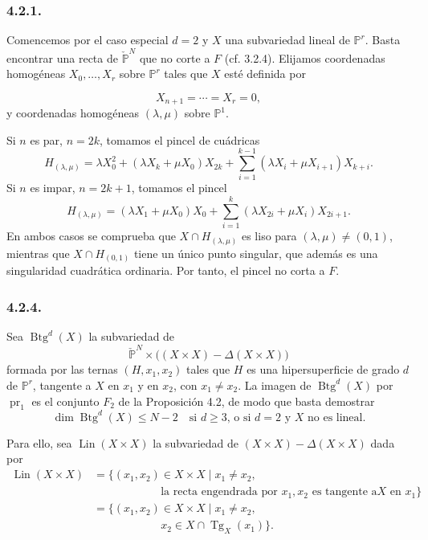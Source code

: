\subsubsection*{4.2.1.}
Comencemos por el caso especial $d=2$ y $X$ una subvariedad lineal
de $\mathbb P^r$. Basta encontrar una recta de
$\check{\mathbb P}^{N}$ que no corte a $F$ (cf. 3.2.4). Elijamos
coordenadas homogéneas $X_0,\ldots,X_r$ sobre $\mathbb P^r$ tales que
$X$ esté definida por

\pageoriginale

\[
X_{n+1}=\cdots=X_r=0,
\]
y coordenadas homogéneas $(\lambda,\mu)$ sobre $\mathbb P^1$.

Si $n$ es par, $n=2k$, tomamos el pincel de cuádricas
\begin{equation}\tag{4.2.2}
H_{(\lambda,\mu)}
=\lambda X_0^2+(\lambda X_k+\mu X_0)X_{2k}
 +\sum_{i=1}^{k-1}(\lambda X_i+\mu X_{i+1})X_{k+i}.
\end{equation}
Si $n$ es impar, $n=2k+1$, tomamos el pincel
\begin{equation}\tag{4.2.3}
H_{(\lambda,\mu)}
=(\lambda X_1+\mu X_0)X_0
 +\sum_{i=1}^{k}(\lambda X_{2i}+\mu X_i)X_{2i+1}.
\end{equation}
En ambos casos se comprueba que $X\cap H_{(\lambda,\mu)}$ es liso
para $(\lambda,\mu)\ne(0,1)$, mientras que
$X\cap H_{(0,1)}$ tiene un único punto singular, que además es una
singularidad cuadrática ordinaria. Por tanto, el pincel no corta a
$F$.

\subsubsection*{4.2.4.}
Sea $\operatorname{Btg}^{d}(X)$ la subvariedad de
\[
\check{\mathbb P}^{N}\times
\bigl((X\times X)-\Delta(X\times X)\bigr)
\]
formada por las ternas $(H,x_1,x_2)$ tales que $H$ es una
hipersuperficie de grado $d$ de $\mathbb P^r$, tangente a $X$ en
$x_1$ y en $x_2$, con $x_1\ne x_2$. La imagen de
$\operatorname{Btg}^{d}(X)$ por $\operatorname{pr}_1$ es el conjunto
$F_2$ de la Proposición 4.2, de modo que basta demostrar
\begin{equation}\tag{4.2.5}
\dim\operatorname{Btg}^{d}(X)\leq N-2
\quad\text{si $d\geq3$, o si $d=2$ y $X$ no es lineal.}
\end{equation}

Para ello, sea $\operatorname{Lin}(X\times X)$ la subvariedad de
$(X\times X)-\Delta(X\times X)$ dada por
{\small\begin{equation}\tag{4.2.6}
\begin{aligned}
\operatorname{Lin}(X\times X)
&=\bigl\{(x_1,x_2)\in X\times X\mid x_1\ne x_2,\\[-1ex]
&\hspace{6em}\text{la recta engendrada por $x_1,x_2$ es tangente a
$X$ en $x_1$}\bigr\}\\
&=\bigl\{(x_1,x_2)\in X\times X\mid x_1\ne x_2,\\[-1ex]
&\hspace{6em}x_2\in X\cap\operatorname{Tg}_X(x_1)\bigr\}.
\end{aligned}
\end{equation}}

